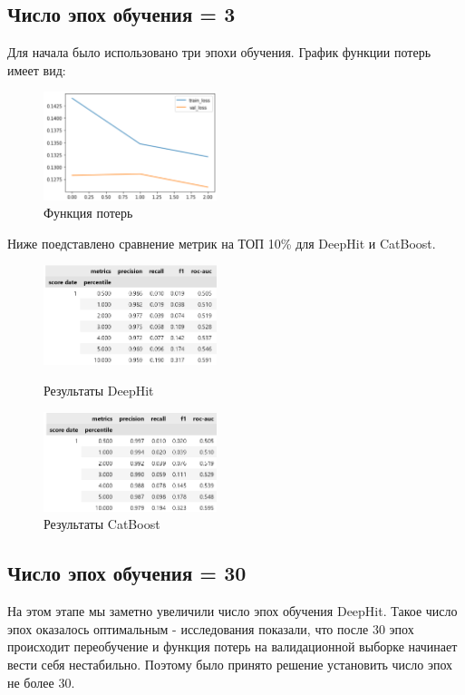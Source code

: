\documentclass[a4paper,14pt,oneside,openany]{memoir}
\begin{document}
\subsection{Число эпох обучения = 3}

Для начала было использовано три эпохи обучения. График функции потерь имеет вид:

\begin{figure}[H]
	\includegraphics[width=0.45\textwidth]{../figures/deephit_losses_3_epoch.png}
	\caption{Функция потерь}
\end{figure}

Ниже поедставлено сравнение метрик на ТОП 10\% для DeepHit и CatBoost. 

\begin{figure}[H]
	\includegraphics[width=0.45\textwidth]{../figures/deephit_reports_3_epoch.png}
	\caption{Результаты DeepHit}
	\includegraphics[width=0.45\textwidth]{../figures/catboost_reports.png}
	\caption{Результаты CatBoost}
\end{figure}

\subsection{Число эпох обучения = 30}

На этом этапе мы заметно увеличили число эпох обучения DeepHit. Такое число эпох оказалось оптимальным - исследования показали, что после 30 эпох происходит переобучение и функция потерь на валидационной выборке начинает вести себя нестабильно. Поэтому было принято решение установить число эпох не более 30.  
\end{document}
